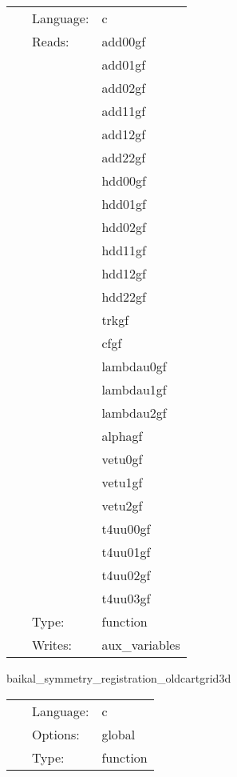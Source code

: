  \begin{tabular*}{160mm}{cll} 
~ & Language:  & c \\ 
~ & Reads:  & add00gf \\ 
~& ~ &add01gf\\ 
~& ~ &add02gf\\ 
~& ~ &add11gf\\ 
~& ~ &add12gf\\ 
~& ~ &add22gf\\ 
~& ~ &hdd00gf\\ 
~& ~ &hdd01gf\\ 
~& ~ &hdd02gf\\ 
~& ~ &hdd11gf\\ 
~& ~ &hdd12gf\\ 
~& ~ &hdd22gf\\ 
~& ~ &trkgf\\ 
~& ~ &cfgf\\ 
~& ~ &lambdau0gf\\ 
~& ~ &lambdau1gf\\ 
~& ~ &lambdau2gf\\ 
~& ~ &alphagf\\ 
~& ~ &vetu0gf\\ 
~& ~ &vetu1gf\\ 
~& ~ &vetu2gf\\ 
~& ~ &t4uu00gf\\ 
~& ~ &t4uu01gf\\ 
~& ~ &t4uu02gf\\ 
~& ~ &t4uu03gf\\ 
~ & Type:  & function \\ 
~ & Writes:  & aux\_variables \\ 
\end{tabular*} 


\vspace{5mm}


\hspace{5mm} baikal\_symmetry\_registration\_oldcartgrid3d 

\hspace{5mm}{\it register symmetries, the cartgrid3d way. } 


\hspace{5mm}

 \begin{tabular*}{160mm}{cll} 
~ & Language:  & c \\ 
~ & Options:  & global \\ 
~ & Type:  & function \\ 
\end{tabular*} 


